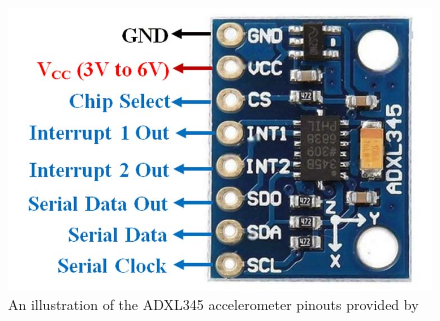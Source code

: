\begin{figure}[H]
	\centering
	\captionsetup{width=1.0\linewidth}


	\includegraphics[width=0.75\linewidth]{graphics/accel_pinouts.jpg}

	\caption[ADXL345 Accelerometer Pinouts]{An illustration of the ADXL345 accelerometer pinouts provided by \cite{components101}}

	\label{fig:accel_pinouts}

\end{figure}